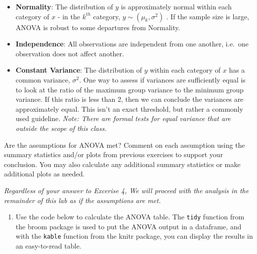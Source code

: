 \documentclass[]{book}
\newenvironment{Shaded}{\begin{snugshade}}{\end{snugshade}}
\newcommand{\KeywordTok}[1]{\textcolor[rgb]{0.13,0.29,0.53}{\textbf{#1}}}
\newcommand{\DataTypeTok}[1]{\textcolor[rgb]{0.13,0.29,0.53}{#1}}
\newcommand{\StringTok}[1]{\textcolor[rgb]{0.31,0.60,0.02}{#1}}
\newcommand{\OperatorTok}[1]{\textcolor[rgb]{0.81,0.36,0.00}{\textbf{#1}}}
\newcommand{\NormalTok}[1]{#1}
\providecommand{\tightlist}{%
  \setlength{\itemsep}{0pt}\setlength{\parskip}{0pt}}
\begin{document}
\begin{itemize}
\tightlist
\item
  \textbf{Normality}: The distribution of \(y\) is approximately normal
  within each category of \(x\) - in the \(k^{th}\) category,
  \(y \sim (\mu_k, \sigma^2)\) . If the sample size is large, ANOVA is
  robust to some departures from Normality.
\item
  \textbf{Independence}: All observations are independent from one
  another, i.e.~one observation does not affect another.
\item
  \textbf{Constant Variance}: The distribution of \(y\) within each
  category of \(x\) has a common variance, \(\sigma^2\). One way to
  assess if variances are sufficiently equal is to look at the ratio of
  the maximum group variance to the minimum group variance. If this
  ratio is less than 2, then we can conclude the variances are
  approximately equal. This isn't an exact threshold, but rather a
  commonly used guideline. \emph{Note: There are formal tests for equal
  variance that are outside the scope of this class.}
\end{itemize}

Are the assumptions for ANOVA met? Comment on each assumption using the
summary statistics and/or plots from previous exercises to support your
conclusion. You may also calculate any additional summary statistics or
make additional plots as needed.

\emph{Regardless of your answer to Excerise 4, We will proceed with the
analysis in the remainder of this lab as if the assumptions are met.}

\begin{enumerate}
\def\labelenumi{\arabic{enumi}.}
\setcounter{enumi}{4}
\tightlist
\item
  Use the code below to calculate the ANOVA table. The \texttt{tidy}
  function from the broom package is used to put the ANOVA output in a
  dataframe, and with the \texttt{kable} function from the knitr
  package, you can display the results in an easy-to-read table.
\end{enumerate}

\begin{Shaded}
\end{Shaded}
\end{document}
